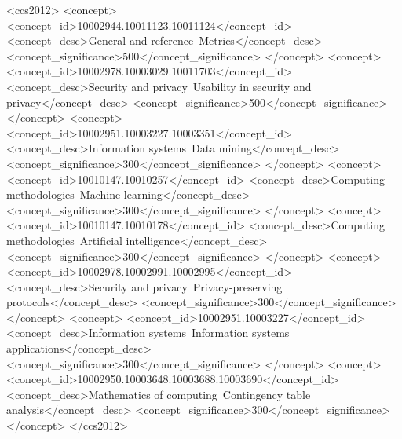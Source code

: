 \documentclass[manuscript,screen,review,anonymous]{acmart}
\begin{document}
\begin{CCSXML}
  <ccs2012>
     <concept>
         <concept_id>10002944.10011123.10011124</concept_id>
         <concept_desc>General and reference~Metrics</concept_desc>
         <concept_significance>500</concept_significance>
         </concept>
     <concept>
         <concept_id>10002978.10003029.10011703</concept_id>
         <concept_desc>Security and privacy~Usability in security and privacy</concept_desc>
         <concept_significance>500</concept_significance>
         </concept>
     <concept>
         <concept_id>10002951.10003227.10003351</concept_id>
         <concept_desc>Information systems~Data mining</concept_desc>
         <concept_significance>300</concept_significance>
         </concept>
     <concept>
         <concept_id>10010147.10010257</concept_id>
         <concept_desc>Computing methodologies~Machine learning</concept_desc>
         <concept_significance>300</concept_significance>
         </concept>
     <concept>
         <concept_id>10010147.10010178</concept_id>
         <concept_desc>Computing methodologies~Artificial intelligence</concept_desc>
         <concept_significance>300</concept_significance>
         </concept>
     <concept>
         <concept_id>10002978.10002991.10002995</concept_id>
         <concept_desc>Security and privacy~Privacy-preserving protocols</concept_desc>
         <concept_significance>300</concept_significance>
         </concept>
     <concept>
         <concept_id>10002951.10003227</concept_id>
         <concept_desc>Information systems~Information systems applications</concept_desc>
         <concept_significance>300</concept_significance>
         </concept>
     <concept>
         <concept_id>10002950.10003648.10003688.10003690</concept_id>
         <concept_desc>Mathematics of computing~Contingency table analysis</concept_desc>
         <concept_significance>300</concept_significance>
         </concept>
   </ccs2012>
\end{CCSXML}

\end{document}
